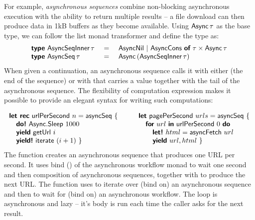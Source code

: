 \documentclass[runningheads,a4paper]{llncs}
\begin{document}
For example, \emph{asynchronous sequences} \cite{async-seq} combine non-blocking asynchronous 
execution with the ability to return multiple results -- a file download can then produce data 
in 1kB buffers as they become available. Using $\textnormal{\sffamily Async}\,\tau$ as the base type, we can
follow the list monad transformer \cite{list-trans} and define the type as:
%
\begin{equation*}
\begin{array}{lcl}
\kvd{type}~\ident{AsyncSeqInner}\,\tau &~=~& \ident{AsyncNil} ~|~
    \ident{AsyncCons}~\kvd{of}~\tau \times \ident{Async}\,\tau \\
\kvd{type}~\ident{AsyncSeq}\,\tau &=& \ident{Async}\,(\ident{AsyncSeqInner}\,\tau)
\end{array}
\end{equation*}
%
When given a continuation, an asynchronous sequence calls it with either 
(the end of the sequence) or with  that carries a value together with
the tail of the asynchronous sequence. The flexibility of computation expression 
makes it possible to provide an elegant syntax for writing such computations:

\begin{equation*}
\begin{array}{l}
\kvd{let rec}~\ident{urlPerSecond}~n = \ident{asyncSeq}~\{ \\
\quad \kvd{do!}~\ident{Async}.\ident{Sleep}~1000 \\
\quad \kvd{yield}~\ident{getUrl}~i \\
\quad \kvd{yield!}~\ident{iterate}~(i+1) ~\}
\end{array}
\qquad
\begin{array}{l}
\kvd{let}~\ident{pagePerSecond}~urls = \ident{asyncSeq}~\{ \\
\quad \kvd{for}~url~\kvd{in}~\ident{urlPerSecond}~0~\kvd{do}\\
\quad\quad \kvd{let!}~html = \ident{asyncFetch}~url \\
\quad\quad \kvd{yield}~url, html ~\}
\end{array}
\end{equation*}
%
The  function creates an asynchronous sequence that produces one URL per
second. It uses bind () of the asynchronous workflow monad to wait one second
and then composition of asynchronous sequences, together with  to produce the 
next URL. The  function uses  to iterate over (bind on) an
asynchronous sequence and then  to wait for (bind on) an asynchronous workflow.
The  loop is asynchronous and lazy -- it's body is run each time the caller asks 
for the next result.
\end{document}
